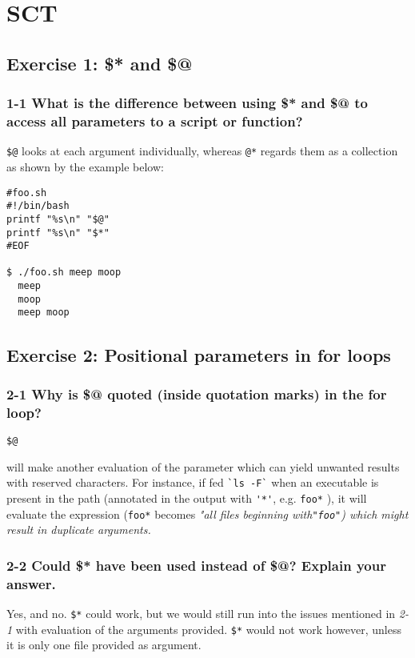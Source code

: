 
\chapter{SCT}
\section{Exercise 1: \$* and \$@}
\subsection{1-1 What is the difference between using \$* and \$@ to access all parameters to a script or function?}
 \verb=$@= looks at each argument individually, whereas \verb=@*= regards them as a collection as shown by the example below:

\begin{verbatim}
#foo.sh
#!/bin/bash
printf "%s\n" "$@"
printf "%s\n" "$*"
#EOF

$ ./foo.sh meep moop
  meep
  moop
  meep moop
\end{verbatim}
\section{Exercise 2: Positional parameters in for loops}
\subsection{2-1 Why is \$@ quoted (inside quotation marks) in the for loop?}
\begin{verbatim}$@\end{verbatim} will make another evaluation of the parameter which can yield unwanted results with reserved characters. For instance, if fed \verb=`ls -F`= when an executable is present in the path (annotated in the output with \verb='*'=, e.g. \verb=foo*= ), it will evaluate the expression (\verb=foo*= becomes \em"all files beginning with\em \verb="foo"=) which might result in duplicate arguments.

\subsection{2-2 Could \$* have been used instead of \$@? Explain your answer.}
Yes, and no. \verb=$*= could work, but we would still run into the issues mentioned in \emph{2-1} with evaluation of the arguments provided. \verb=$*= would not work however, unless it is only one file provided as argument.

